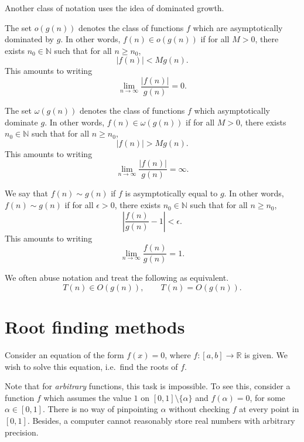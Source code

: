 \documentclass[11pt]{article}
\newcommand{\R}{\mathbb{R}}
\newcommand{\N}{\mathbb{N}}
\theoremstyle{definition}
\theoremstyle{remark}
\numberwithin{equation}{section}
\begin{document}
    Another class of notation uses the idea of dominated growth.

    \begin{definition}
        The set $o(g(n))$ denotes the class of functions $f$ which are asymptotically
        dominated by $g$. In other words, $f(n) \in o(g(n))$ if for all $M >
        0$, there exists $n_0 \in \N$ such that for all $n \geq n_0$, \[
            |f(n)| < M g(n).
        \] This amounts to writing \[
            \lim_{n \to \infty} \frac{|f(n)|}{g(n)} = 0.
        \] 
    \end{definition}
    
    \begin{definition}
        The set $\omega(g(n))$ denotes the class of functions $f$ which
        asymptotically dominate $g$. In other words, $f(n) \in \omega(g(n))$ if for
        all $M > 0$, there exists $n_0 \in \N$ such that for all $n \geq n_0$, \[
            |f(n)| > M g(n).
        \] This amounts to writing \[
            \lim_{n \to \infty} \frac{|f(n)|}{g(n)} = \infty.
        \] 
    \end{definition}
    
    \begin{definition}
        We say that $f(n) \sim g(n)$ if $f$ is asymptotically equal to $g$.
        In other words, $f(n) \sim g(n)$ if for all $\epsilon > 0$, there exists $n_0
        \in \N$ such that for all $n \geq n_0$, \[
            \left| \frac{f(n)}{g(n)} - 1 \right| < \epsilon.
        \] This amounts to writing \[
            \lim_{n \to \infty} \frac{f(n)}{g(n)} = 1.
        \] 
    \end{definition}

    We often abuse notation and treat the following as equivalent. \[
        T(n) \in O(g(n)), \qquad T(n) = O(g(n)).
    \] 


    \section{Root finding methods}

    Consider an equation of the form $f(x) = 0$, where $f\colon [a, b] \to \R$ is
    given. We wish to solve this equation, i.e.\ find the roots of $f$.

    Note that for \emph{arbitrary} functions, this task is impossible. To see this,
    consider a function $f$ which assumes the value $1$ on $[0, 1] \setminus
    \{\alpha\}$ and $f(\alpha) = 0$, for some $\alpha \in [0, 1]$. There is no way of
    pinpointing $\alpha$ without checking $f$ at every point in $[0, 1]$. Besides, a
    computer cannot reasonably store real numbers with arbitrary precision.
\end{document}

